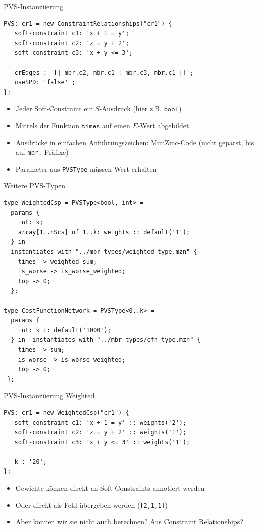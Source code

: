 \begin{frame}[fragile]{PVS-Instanziierung}
\begin{lstlisting}
PVS: cr1 = new ConstraintRelationships("cr1") {
   soft-constraint c1: 'x + 1 = y';
   soft-constraint c2: 'z = y + 2';
   soft-constraint c3: 'x + y <= 3';
   
   crEdges : '[| mbr.c2, mbr.c1 | mbr.c3, mbr.c1 |]';
   useSPD: 'false' ;
}; 
\end{lstlisting}
\begin{itemize}
\item Jeder Soft-Constraint ein $S$-Ausdruck (hier z.B. $\mathtt{bool}$)
\item Mittels der Funktion $\mathtt{times}$ auf einen $E$-Wert abgebildet
\item Ausdrücke in einfachen Anführungszeichen: \alert{MiniZinc}-Code (nicht geparst, bis auf \texttt{mbr.}-Präfixe)
\item Parameter aus \texttt{PVSType} müssen Wert erhalten
\end{itemize}
\end{frame}

\begin{frame}[fragile]{Weitere PVS-Typen}
\begin{lstlisting}
type WeightedCsp = PVSType<bool, int> = 
  params {
    int: k; 
    array[1..nScs] of 1..k: weights :: default('1');
  } in  
  instantiates with "../mbr_types/weighted_type.mzn" {
    times -> weighted_sum;
    is_worse -> is_worse_weighted;
    top -> 0;
  };
  
type CostFunctionNetwork = PVSType<0..k> = 
  params {
    int: k :: default('1000'); 
  } in  instantiates with "../mbr_types/cfn_type.mzn" {
    times -> sum;
    is_worse -> is_worse_weighted; 
    top -> 0;
 };
\end{lstlisting}
\end{frame}

\begin{frame}[fragile]{PVS-Instanziierung Weighted}
\begin{lstlisting}
PVS: cr1 = new WeightedCsp("cr1") {
   soft-constraint c1: 'x + 1 = y' :: weights('2');
   soft-constraint c2: 'z = y + 2' :: weights('1');
   soft-constraint c3: 'x + y <= 3' :: weights('1');
   
   k : '20';
}; 
\end{lstlisting}
\begin{itemize}
\item Gewichte können direkt an Soft Constraints annotiert werden
\item Oder direkt als Feld übergeben werden (\texttt{[2,1,1]}) \pause 
\item Aber können wir sie nicht auch berechnen? Aus Constraint Relationships? \pause 
\end{itemize}
\end{frame}



